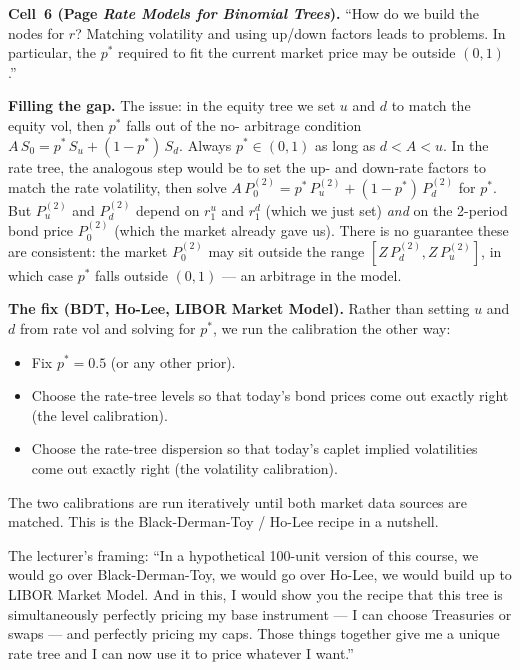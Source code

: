 \begin{keyblock}
\textbf{Cell~6 (Page \emph{Rate Models for Binomial Trees}).}
``How do we build the nodes for $r$? Matching volatility and using
up/down factors leads to problems. In particular, the $p^*$
required to fit the current market price may be outside $(0, 1)$.''
\end{keyblock}

\begin{tipblock}
\textbf{Filling the gap.} The issue: in the equity tree we set $u$
and $d$ to match the equity vol, then $p^*$ falls out of the no-
arbitrage condition $A\,S_0 = p^*\,S_u + (1 - p^*)\,S_d$. Always
$p^* \in (0, 1)$ as long as $d < A < u$. In the rate tree, the
analogous step would be to set the up- and down-rate factors to
match the rate volatility, then solve $A\,P^{(2)}_0 = p^*\,P^{(2)}_u
+ (1 - p^*)\,P^{(2)}_d$ for $p^*$. But $P^{(2)}_u$ and $P^{(2)}_d$
depend on $r_1^u$ and $r_1^d$ (which we just set) \emph{and} on the
2-period bond price $P^{(2)}_0$ (which the market already gave us).
There is no guarantee these are consistent: the market $P^{(2)}_0$
may sit outside the range $[Z\,P^{(2)}_d, Z\,P^{(2)}_u]$, in which
case $p^*$ falls outside $(0, 1)$ --- an arbitrage in the model.
\end{tipblock}

\begin{keyblock}
\textbf{The fix (BDT, Ho-Lee, LIBOR Market Model).}
Rather than setting $u$ and $d$ from rate vol and solving for
$p^*$, we run the calibration the other way:
\begin{itemize}
  \item Fix $p^* = 0.5$ (or any other prior).
  \item Choose the rate-tree levels so that today's bond prices
        come out exactly right (the level calibration).
  \item Choose the rate-tree dispersion so that today's caplet
        implied volatilities come out exactly right (the volatility
        calibration).
\end{itemize}
The two calibrations are run iteratively until both market data
sources are matched. This is the Black-Derman-Toy / Ho-Lee
recipe in a nutshell.
\end{keyblock}

The lecturer's framing: ``In a hypothetical 100-unit version of
this course, we would go over Black-Derman-Toy, we would go over
Ho-Lee, we would build up to LIBOR Market Model. And in this, I
would show you the recipe that this tree is simultaneously
perfectly pricing my base instrument --- I can choose Treasuries
or swaps --- and perfectly pricing my caps. Those things together
give me a unique rate tree and I can now use it to price whatever
I want.''

